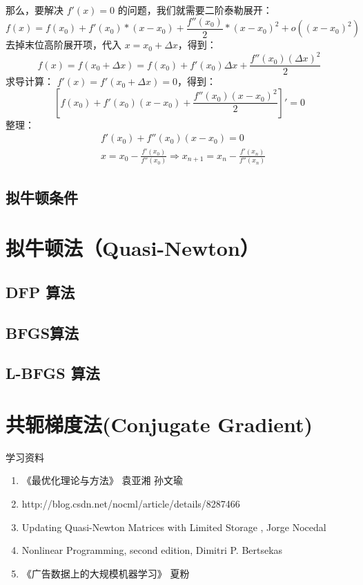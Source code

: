 \documentclass[a4paper,10pt]{ctexbook}
\begin{document}
那么，要解决 $f'(x) = 0$ 的问题，我们就需要二阶泰勒展开：
\[
    f(x) = f(x_0) + f'(x_0)*(x-x_0) + \frac{f''(x_0)}{2}*(x-x_0)^2 + o((x-x_0)^2)
\]
去掉末位高阶展开项，代入 $x = x_0+\Delta x$，得到：
\[
    f(x) = f(x_0+\Delta x) = f(x_0) + f'(x_0) \Delta x + \frac{f''(x_0) (\Delta x)^2}{2}
\]
求导计算： $f'(x) = f'(x_0+\Delta x) = 0$，得到：
\[
    [f(x_0) + f'(x_0)(x−x_0) + \frac{f''(x_0)(x−x_0)^2}{2}]′ = 0
\]
整理：
\begin{align*}
    & f'(x_0) + f''(x_0)(x−x_0) = 0 \\
    & x = x_0 − \frac{f'(x_0)}{f''(x_0)} \Rightarrow  x_{n+1} = x_n - \frac{f'(x_n)}{f''(x_n)}
\end{align*}

\subsection{拟牛顿条件}

\section{拟牛顿法（Quasi-Newton）}
\subsection{DFP 算法}
\subsection{BFGS算法}
\subsection{L-BFGS 算法}


\section{共轭梯度法(Conjugate Gradient)}
学习资料
\begin{enumerate}
\item《最优化理论与方法》 袁亚湘 孙文瑜
\item http://blog.csdn.net/nocml/article/details/8287466
\item Updating Quasi-Newton Matrices with Limited Storage , Jorge Nocedal
\item Nonlinear Programming, second edition, Dimitri P. Bertsekas
\item《广告数据上的大规模机器学习》  夏粉
\end{enumerate}

\ifx\mlbook\undefined
    
\end{document}
